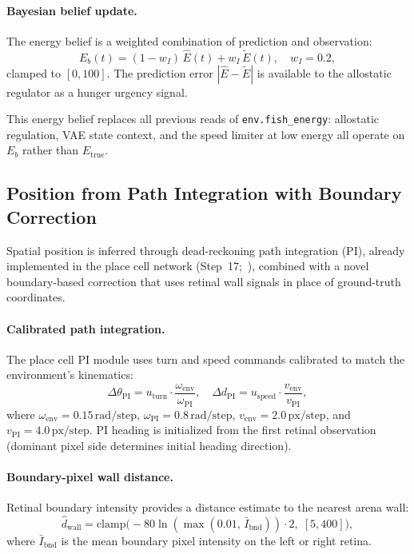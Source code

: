 \documentclass[11pt,a4paper]{article}
\begin{document}
\paragraph{Bayesian belief update.}
The energy belief is a weighted combination of prediction and observation:
\begin{equation}\label{eq:energy_belief}
\boxed{
  E_b(t) = (1 - w_I)\,\hat{E}(t) + w_I\,\tilde{E}(t),
  \quad w_I = 0.2,
}
\end{equation}
clamped to $[0, 100]$.
The prediction error $|\hat{E} - \tilde{E}|$ is available to the
allostatic regulator as a hunger urgency signal.

This energy belief replaces all previous reads of \texttt{env.fish\_energy}:
allostatic regulation, VAE state context, and the speed limiter at low
energy all operate on $E_b$ rather than $E_\text{true}$.

\subsection{Position from Path Integration with Boundary Correction}
\label{sec:position_inference}

Spatial position is inferred through dead-reckoning path integration (PI),
already implemented in the place cell network
(Step~17;~\cite{mcnaughton2006,etienne2004,moser2008}),
combined with a novel boundary-based correction that uses retinal wall
signals in place of ground-truth coordinates.

\paragraph{Calibrated path integration.}
The place cell PI module uses turn and speed commands calibrated to match
the environment's kinematics:
\begin{equation}\label{eq:pi_calibration}
  \Delta\theta_\text{PI} = u_\text{turn} \cdot \frac{\omega_\text{env}}{\omega_\text{PI}},
  \quad
  \Delta d_\text{PI} = u_\text{speed} \cdot \frac{v_\text{env}}{v_\text{PI}},
\end{equation}
where $\omega_\text{env} = 0.15\,\text{rad/step}$,
$\omega_\text{PI} = 0.8\,\text{rad/step}$,
$v_\text{env} = 2.0\,\text{px/step}$, and
$v_\text{PI} = 4.0\,\text{px/step}$.
PI heading is initialized from the first retinal observation (dominant
pixel side determines initial heading direction).

\paragraph{Boundary-pixel wall distance.}
Retinal boundary intensity provides a distance estimate to the nearest
arena wall:
\begin{equation}\label{eq:wall_distance}
  \hat{d}_\text{wall} = \text{clamp}\!\bigl(-80 \ln(\max(0.01,\, \bar{I}_\text{bnd})) \cdot 2,\;
  [5, 400]\bigr),
\end{equation}
where $\bar{I}_\text{bnd}$ is the mean boundary pixel intensity on the
left or right retina.
\end{document}

